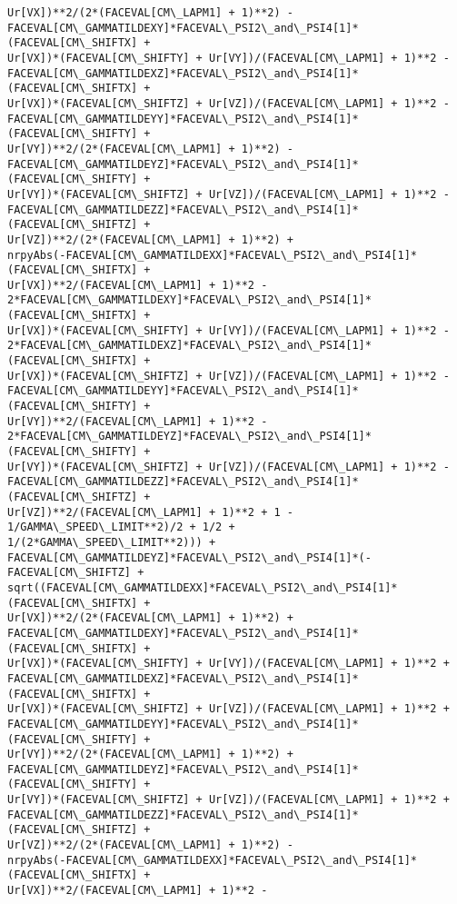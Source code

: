 \documentclass[landscape,letterpaper,10pt,english]{article}
\begin{document}
\begin{Verbatim}[commandchars=\\\{\}]
Ur[VX])**2/(2*(FACEVAL[CM\_LAPM1] + 1)**2) -
FACEVAL[CM\_GAMMATILDEXY]*FACEVAL\_PSI2\_and\_PSI4[1]*(FACEVAL[CM\_SHIFTX] +
Ur[VX])*(FACEVAL[CM\_SHIFTY] + Ur[VY])/(FACEVAL[CM\_LAPM1] + 1)**2 -
FACEVAL[CM\_GAMMATILDEXZ]*FACEVAL\_PSI2\_and\_PSI4[1]*(FACEVAL[CM\_SHIFTX] +
Ur[VX])*(FACEVAL[CM\_SHIFTZ] + Ur[VZ])/(FACEVAL[CM\_LAPM1] + 1)**2 -
FACEVAL[CM\_GAMMATILDEYY]*FACEVAL\_PSI2\_and\_PSI4[1]*(FACEVAL[CM\_SHIFTY] +
Ur[VY])**2/(2*(FACEVAL[CM\_LAPM1] + 1)**2) -
FACEVAL[CM\_GAMMATILDEYZ]*FACEVAL\_PSI2\_and\_PSI4[1]*(FACEVAL[CM\_SHIFTY] +
Ur[VY])*(FACEVAL[CM\_SHIFTZ] + Ur[VZ])/(FACEVAL[CM\_LAPM1] + 1)**2 -
FACEVAL[CM\_GAMMATILDEZZ]*FACEVAL\_PSI2\_and\_PSI4[1]*(FACEVAL[CM\_SHIFTZ] +
Ur[VZ])**2/(2*(FACEVAL[CM\_LAPM1] + 1)**2) +
nrpyAbs(-FACEVAL[CM\_GAMMATILDEXX]*FACEVAL\_PSI2\_and\_PSI4[1]*(FACEVAL[CM\_SHIFTX] +
Ur[VX])**2/(FACEVAL[CM\_LAPM1] + 1)**2 -
2*FACEVAL[CM\_GAMMATILDEXY]*FACEVAL\_PSI2\_and\_PSI4[1]*(FACEVAL[CM\_SHIFTX] +
Ur[VX])*(FACEVAL[CM\_SHIFTY] + Ur[VY])/(FACEVAL[CM\_LAPM1] + 1)**2 -
2*FACEVAL[CM\_GAMMATILDEXZ]*FACEVAL\_PSI2\_and\_PSI4[1]*(FACEVAL[CM\_SHIFTX] +
Ur[VX])*(FACEVAL[CM\_SHIFTZ] + Ur[VZ])/(FACEVAL[CM\_LAPM1] + 1)**2 -
FACEVAL[CM\_GAMMATILDEYY]*FACEVAL\_PSI2\_and\_PSI4[1]*(FACEVAL[CM\_SHIFTY] +
Ur[VY])**2/(FACEVAL[CM\_LAPM1] + 1)**2 -
2*FACEVAL[CM\_GAMMATILDEYZ]*FACEVAL\_PSI2\_and\_PSI4[1]*(FACEVAL[CM\_SHIFTY] +
Ur[VY])*(FACEVAL[CM\_SHIFTZ] + Ur[VZ])/(FACEVAL[CM\_LAPM1] + 1)**2 -
FACEVAL[CM\_GAMMATILDEZZ]*FACEVAL\_PSI2\_and\_PSI4[1]*(FACEVAL[CM\_SHIFTZ] +
Ur[VZ])**2/(FACEVAL[CM\_LAPM1] + 1)**2 + 1 - 1/GAMMA\_SPEED\_LIMIT**2)/2 + 1/2 +
1/(2*GAMMA\_SPEED\_LIMIT**2))) +
FACEVAL[CM\_GAMMATILDEYZ]*FACEVAL\_PSI2\_and\_PSI4[1]*(-FACEVAL[CM\_SHIFTZ] +
sqrt((FACEVAL[CM\_GAMMATILDEXX]*FACEVAL\_PSI2\_and\_PSI4[1]*(FACEVAL[CM\_SHIFTX] +
Ur[VX])**2/(2*(FACEVAL[CM\_LAPM1] + 1)**2) +
FACEVAL[CM\_GAMMATILDEXY]*FACEVAL\_PSI2\_and\_PSI4[1]*(FACEVAL[CM\_SHIFTX] +
Ur[VX])*(FACEVAL[CM\_SHIFTY] + Ur[VY])/(FACEVAL[CM\_LAPM1] + 1)**2 +
FACEVAL[CM\_GAMMATILDEXZ]*FACEVAL\_PSI2\_and\_PSI4[1]*(FACEVAL[CM\_SHIFTX] +
Ur[VX])*(FACEVAL[CM\_SHIFTZ] + Ur[VZ])/(FACEVAL[CM\_LAPM1] + 1)**2 +
FACEVAL[CM\_GAMMATILDEYY]*FACEVAL\_PSI2\_and\_PSI4[1]*(FACEVAL[CM\_SHIFTY] +
Ur[VY])**2/(2*(FACEVAL[CM\_LAPM1] + 1)**2) +
FACEVAL[CM\_GAMMATILDEYZ]*FACEVAL\_PSI2\_and\_PSI4[1]*(FACEVAL[CM\_SHIFTY] +
Ur[VY])*(FACEVAL[CM\_SHIFTZ] + Ur[VZ])/(FACEVAL[CM\_LAPM1] + 1)**2 +
FACEVAL[CM\_GAMMATILDEZZ]*FACEVAL\_PSI2\_and\_PSI4[1]*(FACEVAL[CM\_SHIFTZ] +
Ur[VZ])**2/(2*(FACEVAL[CM\_LAPM1] + 1)**2) -
nrpyAbs(-FACEVAL[CM\_GAMMATILDEXX]*FACEVAL\_PSI2\_and\_PSI4[1]*(FACEVAL[CM\_SHIFTX] +
Ur[VX])**2/(FACEVAL[CM\_LAPM1] + 1)**2 -

\end{Verbatim}
\end{document}
